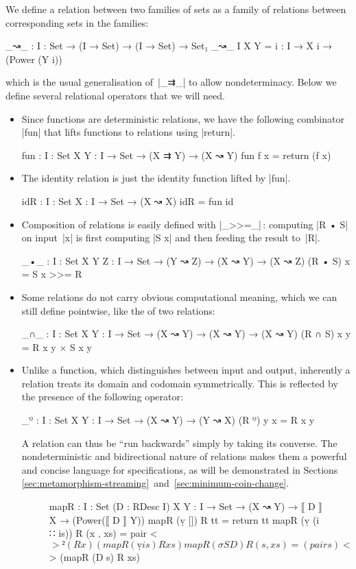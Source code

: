We define a relation between two families of sets as a family of relations between corresponding sets in the families:
\begin{code}
_↝_ : {I : Set} → (I → Set) → (I → Set) → Set₁
_↝_ {I} X Y = {i : I} → X i → (Power (Y i))
\end{code}
which is the usual generalisation of~|_⇉_| to allow nondeterminacy.
Below we define several relational operators that we will need.
\begin{itemize}
\item Since functions are deterministic relations, we have the following combinator |fun| that lifts functions to relations using |return|.
\begin{code}
fun : {I : Set} {X Y : I → Set} → (X ⇉ Y) → (X ↝ Y)
fun f x = return (f x)
\end{code}
\item The identity relation is just the identity function lifted by |fun|.
\begin{code}
idR : {I : Set} {X : I → Set} → (X ↝ X)
idR = fun id
\end{code}
\item Composition of relations is easily defined with |_>>=_|\,: computing |R • S| on input~|x| is first computing |S x| and then feeding the result to~|R|.
\begin{code}
_•_ : {I : Set} {X Y Z : I → Set} → (Y ↝ Z) → (X ↝ Y) → (X ↝ Z)
(R • S) x = S x >>= R
\end{code}
\item Some relations do not carry obvious computational meaning, which we can still define pointwise, like the  of two relations:
\begin{code}
_∩_ : {I : Set} {X Y : I → Set} → (X ↝ Y) → (X ↝ Y) → (X ↝ Y)
(R ∩ S) x y = R x y × S x y
\end{code}
\item Unlike a function, which distinguishes between input and output, inherently a relation treats its domain and codomain symmetrically.
This is reflected by the presence of the following  operator:
\begin{code}
_º : {I : Set} {X Y : I → Set} → (X ↝ Y) → (Y ↝ X)
(R º) y x = R x y
\end{code}
A relation can thus be ``run backwards'' simply by taking its converse.
The nondeterministic and bidirectional nature of relations makes them a powerful and concise language for specifications, as will be demonstrated in Sections \ref{sec:metamorphism-streaming}~and~\ref{sec:minimum-coin-change}.
\begin{figure}
\codefigure
\begin{code}
mapR :  {I : Set} (D : RDesc I) {X Y : I → Set} →
        (X ↝ Y) → ⟦ D ⟧ X → (Power(⟦ D ⟧ Y))
mapR (ṿ [])        R tt        =  return tt
mapR (ṿ (i ∷ is))  R (x , xs)  =  pair <$>² (R x) (mapR (ṿ is) R xs)
mapR (σ S D)       R (s , xs)  =  (pair s) <$> (mapR (D s) R xs)


\end{code}
\end{figure}
\end{itemize}
